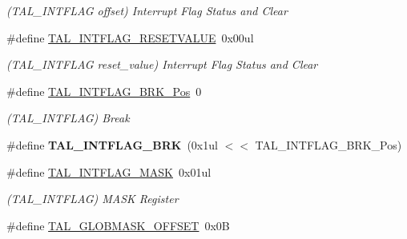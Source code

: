 \begin{DoxyCompactItemize}
\begin{DoxyCompactList}\small\item\em (T\+A\+L\+\_\+\+I\+N\+T\+F\+L\+A\+G offset) Interrupt Flag Status and Clear \end{DoxyCompactList}\item 
\hypertarget{group___s_a_m_l21___t_a_l_ga03c2df616ceb7282e69ad2716b96c66c}{}\#define \hyperlink{group___s_a_m_l21___t_a_l_ga03c2df616ceb7282e69ad2716b96c66c}{T\+A\+L\+\_\+\+I\+N\+T\+F\+L\+A\+G\+\_\+\+R\+E\+S\+E\+T\+V\+A\+L\+U\+E}~0x00ul\label{group___s_a_m_l21___t_a_l_ga03c2df616ceb7282e69ad2716b96c66c}

\begin{DoxyCompactList}\small\item\em (T\+A\+L\+\_\+\+I\+N\+T\+F\+L\+A\+G reset\+\_\+value) Interrupt Flag Status and Clear \end{DoxyCompactList}\item 
\hypertarget{group___s_a_m_l21___t_a_l_ga895919b228bc2e4f8fabe74b1869b17f}{}\#define \hyperlink{group___s_a_m_l21___t_a_l_ga895919b228bc2e4f8fabe74b1869b17f}{T\+A\+L\+\_\+\+I\+N\+T\+F\+L\+A\+G\+\_\+\+B\+R\+K\+\_\+\+Pos}~0\label{group___s_a_m_l21___t_a_l_ga895919b228bc2e4f8fabe74b1869b17f}

\begin{DoxyCompactList}\small\item\em (T\+A\+L\+\_\+\+I\+N\+T\+F\+L\+A\+G) Break \end{DoxyCompactList}\item 
\hypertarget{group___s_a_m_l21___t_a_l_ga5ff9819453457f9a94844b65901a6e17}{}\#define {\bfseries T\+A\+L\+\_\+\+I\+N\+T\+F\+L\+A\+G\+\_\+\+B\+R\+K}~(0x1ul $<$$<$ T\+A\+L\+\_\+\+I\+N\+T\+F\+L\+A\+G\+\_\+\+B\+R\+K\+\_\+\+Pos)\label{group___s_a_m_l21___t_a_l_ga5ff9819453457f9a94844b65901a6e17}

\item 
\hypertarget{group___s_a_m_l21___t_a_l_gad4511bb8f3348db6ac3b0184b99c95e7}{}\#define \hyperlink{group___s_a_m_l21___t_a_l_gad4511bb8f3348db6ac3b0184b99c95e7}{T\+A\+L\+\_\+\+I\+N\+T\+F\+L\+A\+G\+\_\+\+M\+A\+S\+K}~0x01ul\label{group___s_a_m_l21___t_a_l_gad4511bb8f3348db6ac3b0184b99c95e7}

\begin{DoxyCompactList}\small\item\em (T\+A\+L\+\_\+\+I\+N\+T\+F\+L\+A\+G) M\+A\+S\+K Register \end{DoxyCompactList}\item 
\hypertarget{group___s_a_m_l21___t_a_l_ga3fa16439196f8a70552f99f15bf780d2}{}\#define \hyperlink{group___s_a_m_l21___t_a_l_ga3fa16439196f8a70552f99f15bf780d2}{T\+A\+L\+\_\+\+G\+L\+O\+B\+M\+A\+S\+K\+\_\+\+O\+F\+F\+S\+E\+T}~0x0\+B\label{group___s_a_m_l21___t_a_l_ga3fa16439196f8a70552f99f15bf780d2}


\end{DoxyCompactItemize}
